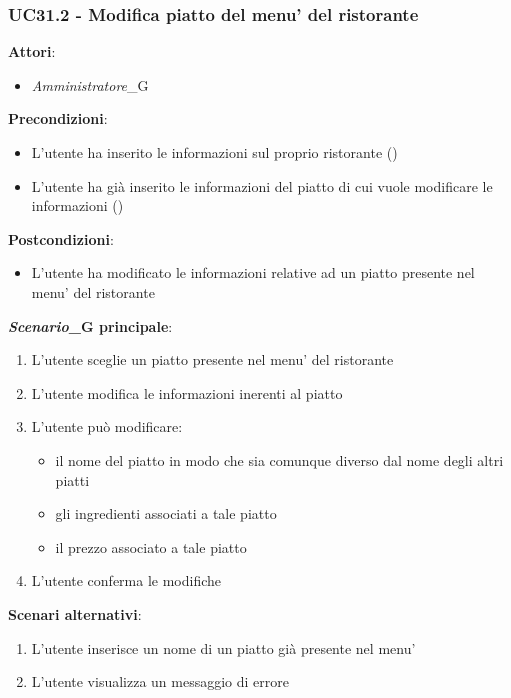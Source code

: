 \subsubsection{UC31.2 - Modifica piatto del menu' del ristorante}\label{usecase:31_2}
\textbf{Attori}:
\begin{itemize}
    \item \textit{Amministratore}_G
\end{itemize}
\textbf{Precondizioni}:
\begin{itemize}
    \item L'utente ha inserito le informazioni sul proprio ristorante ()
    \item L'utente ha già inserito le informazioni del piatto di cui vuole modificare le informazioni ()
\end{itemize}
\textbf{Postcondizioni}:
\begin{itemize}
    \item L'utente ha modificato le informazioni relative ad un piatto presente nel menu' del ristorante
\end{itemize}
\textbf{\textit{Scenario}_G principale}:
\begin{enumerate}
    \item L'utente sceglie un piatto presente nel menu' del ristorante
    \item L'utente modifica le informazioni inerenti al piatto
    \item L'utente può modificare:
    \begin{itemize}
        \item il nome del piatto in modo che sia comunque diverso dal nome degli altri piatti
        \item gli ingredienti associati a tale piatto
        \item il prezzo associato a tale piatto
    \end{itemize}
    \item L'utente conferma le modifiche
\end{enumerate}
\textbf{Scenari alternativi}:
\begin{enumerate}
    \item L’utente inserisce un nome di un piatto già presente nel menu’
    \item L'utente visualizza un messaggio di errore
\end{enumerate}